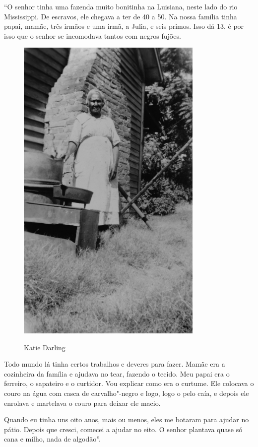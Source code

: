 ``O senhor tinha uma fazenda muito bonitinha na Luisiana, neste lado do
rio Mississippi. De escravos, ele chegava a ter de 40 a 50. Na nossa
família tinha papai, mamãe, três irmãos e uma irmã, a Julia, e seis
primos. Isso dá 13, é por isso que o senhor se incomodava tantos com
negros fujões.

\pagebreak
\thispagestyle{empty}
\begin{figure}[!ht]
\centering
 \includegraphics[width=90mm]{./imgs/katiedarling_recorte.jpg} \label{img1}
\caption{Katie Darling}
\end{figure}

Todo mundo lá tinha certos trabalhos e deveres para fazer. Mamãe era a
cozinheira da família e ajudava no tear, fazendo o tecido. Meu papai era
o ferreiro, o sapateiro e o curtidor. Vou explicar como era o curtume.
Ele colocava o couro na água com casca de carvalho"-negro e logo, logo o
pelo caía, e depois ele enrolava e martelava o couro para deixar ele
macio.

Quando eu tinha uns oito anos, mais ou menos, eles me botaram para
ajudar no pátio. Depois que cresci, comecei a ajudar no eito. O senhor
plantava quase só cana e milho, nada de algodão''.

